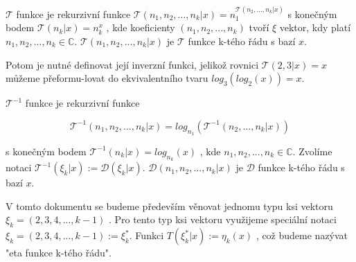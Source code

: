 \begin{definition}
      \(\mathcal{T}\) funkce je rekurzivní funkce \(\mathcal{T}(n_1,
      n_2, ..., n_k | x) = n_1^{\mathcal{T}(n_2, ..., n_k | x)}\) s
      konečným bodem \(\mathcal{T}(n_k | x ) = n_k^x\) , kde koeficienty
      \((n_1, n_2, ..., n_k)\) tvoří \(\xi\) vektor, kdy platí \(n_1, 
      n_2, ..., n_k \in  \mathbb{C}\).  \(\mathcal{T}(n_1, n_2, ..., 
      n_k | x) \) je \(\mathcal{T}\) funkce k-tého řádu s bazí \(x\).
\end{definition}

Potom je nutné definovat její inverzní funkci, jelikož rovnici 
\(\mathcal{T}(2, 3 | x) = x\)  můžeme přeformu-lovat do 
ekvivalentního tvaru \(log_3(log_2(x)) = x\).

\begin{definition}
      \(\mathcal{T}^{-1}\) funkce je rekurzivní funkce 
      
      \begin{equation}
            \mathcal{T}^{-1}(n_1, n_2, ..., n_k | x) 
            = log_{n_1}({\mathcal{T}^{-1}(n_2,
            ..., n_k | x)})
      \label{3}
      \end{equation}
      
      s konečným bodem \(\mathcal{T}^{-1}(n_k | x ) 
      = log_{n_k}(x)\) , kde \(n_1, n_2, ..., n_k \in
      \mathbb{C}\). Zvolíme notaci \(\mathcal{T}^{-1}(\xi_k 
      | x) := \mathcal{D}(\xi_k | x)\). \(\mathcal{D}(n_1,
      n_2, ..., n_k | x) \) je \(\mathcal{D}\) funkce k-tého
      řádu s bazí \(x\).
\end{definition}

V tomto dokumentu se budeme především věnovat 
jednomu typu ksi vektoru \(\xi_k = (2, 3, 4, ..., k-1)\)
. Pro tento typ ksi vektoru využijeme speciální notaci
\(\xi_k = (2, 3, 4, ..., k-1) := \xi_k^*\). Funkci
\(T(\xi_k^* | x) := \eta_k(x)\)
, což budeme nazývat "eta funkce k-tého řádu".


